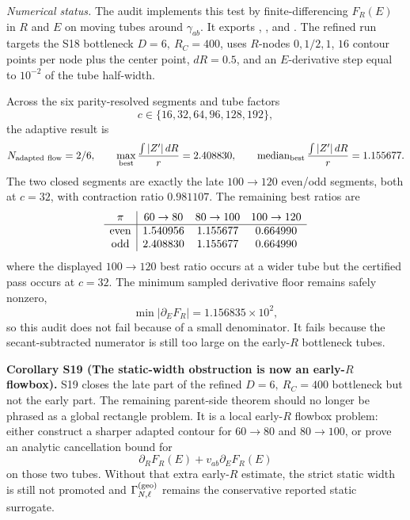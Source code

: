 \documentclass[aps,prd,onecolumn,notitlepage,nofootinbib,superscriptaddress,11pt,floatfix]{revtex4-2}
\begin{document}
\emph{Numerical status.}
The audit  implements this test by finite-differencing \(F_R(E)\) in \(R\) and \(E\) on moving tubes around \(\gamma_{ab}\).  It exports , , and .  The refined run targets the S18 bottleneck \(D=6,\ R_C=400\), uses \(R\)-nodes \(0,1/2,1\), \(16\) contour points per node plus the center point, \(dR=0.5\), and an \(E\)-derivative step equal to \(10^{-2}\) of the tube half-width.

Across the six parity-resolved segments and tube factors
\[
c\in\{16,32,64,96,128,192\},
\]
the adaptive result is
\[
N_{\rm adapted\ flow}=2/6,\qquad
\max_{\rm best}\frac{\int |Z'|\,dR}{r}=2.408830,\qquad
\operatorname{median}_{\rm best}\frac{\int |Z'|\,dR}{r}=1.155677.
\]
The two closed segments are exactly the late \(100\to120\) even/odd segments, both at \(c=32\), with contraction ratio \(0.981107\).  The remaining best ratios are
\[
\begin{array}{c|ccc}
\pi & 60\to80 & 80\to100 & 100\to120\\
\hline
{\rm even} & 1.540956 & 1.155677 & 0.664990\\
{\rm odd}  & 2.408830 & 1.155677 & 0.664990
\end{array}
\]
where the displayed \(100\to120\) best ratio occurs at a wider tube but the certified pass occurs at \(c=32\).  The minimum sampled derivative floor remains safely nonzero,
\[
\min |\partial_EF_R|=1.156835\times10^2,
\]
so this audit does not fail because of a small denominator.  It fails because the secant-subtracted numerator is still too large on the early-\(R\) bottleneck tubes.

\medskip\noindent\textbf{Corollary S19 (The static-width obstruction is now an early-\(R\) flowbox).}
S19 closes the late part of the refined \(D=6,\ R_C=400\) bottleneck but not the early part.  The remaining parent-side theorem should no longer be phrased as a global rectangle problem.  It is a local early-\(R\) flowbox problem: either construct a sharper adapted contour for \(60\to80\) and \(80\to100\), or prove an analytic cancellation bound for
\[
\partial_RF_R(E)+v_{ab}\partial_EF_R(E)
\]
on those two tubes.  Without that extra early-\(R\) estimate, the strict static width is still not promoted and \(\Gamma_{N,\ell}^{\rm(geo)}\) remains the conservative reported static surrogate.
\end{document}
